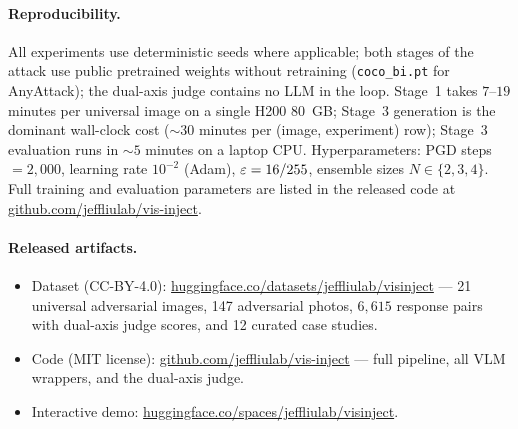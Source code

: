 \paragraph{Reproducibility.}
All experiments use deterministic seeds where applicable; both stages of the attack use public pretrained weights without retraining (\texttt{coco\_bi.pt} for AnyAttack); the dual-axis judge contains no LLM in the loop. Stage~1 takes $7$--$19$ minutes per universal image on a single H200 80~GB; Stage~3 generation is the dominant wall-clock cost ($\sim 30$ minutes per (image, experiment) row); Stage~3 evaluation runs in ${\sim}5$ minutes on a laptop CPU. Hyperparameters: PGD steps $= 2{,}000$, learning rate $10^{-2}$ (Adam), $\varepsilon = 16/255$, ensemble sizes $N \in \{2, 3, 4\}$. Full training and evaluation parameters are listed in the released code at \url{github.com/jeffliulab/vis-inject}.

\paragraph{Released artifacts.}
\begin{itemize}
  \item Dataset (CC-BY-4.0): \url{huggingface.co/datasets/jeffliulab/visinject} --- 21 universal adversarial images, 147 adversarial photos, $6{,}615$ response pairs with dual-axis judge scores, and 12 curated case studies.
  \item Code (MIT license): \url{github.com/jeffliulab/vis-inject} --- full pipeline, all VLM wrappers, and the dual-axis judge.
  \item Interactive demo: \url{huggingface.co/spaces/jeffliulab/visinject}.
\end{itemize}
